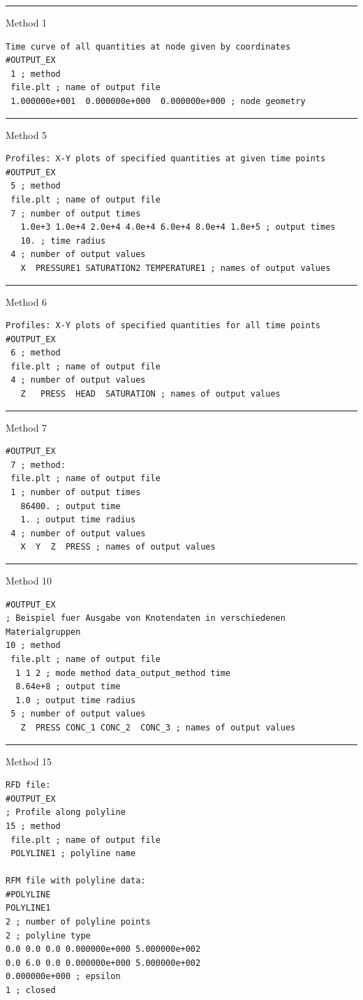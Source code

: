 \hrule
Method 1
\small
\begin{verbatim}
Time curve of all quantities at node given by coordinates
#OUTPUT_EX
 1 ; method
 file.plt ; name of output file
 1.000000e+001  0.000000e+000  0.000000e+000 ; node geometry
\end{verbatim}
\normalsize

\hrule
Method 5
\small
\begin{verbatim}
Profiles: X-Y plots of specified quantities at given time points
#OUTPUT_EX
 5 ; method
 file.plt ; name of output file
 7 ; number of output times
   1.0e+3 1.0e+4 2.0e+4 4.0e+4 6.0e+4 8.0e+4 1.0e+5 ; output times
   10. ; time radius
 4 ; number of output values
   X  PRESSURE1 SATURATION2 TEMPERATURE1 ; names of output values
\end{verbatim}
\normalsize

\hrule
Method 6
\small
\begin{verbatim}
Profiles: X-Y plots of specified quantities for all time points
#OUTPUT_EX
 6 ; method
 file.plt ; name of output file
 4 ; number of output values
   Z   PRESS  HEAD  SATURATION ; names of output values
\end{verbatim}
\normalsize

\hrule
Method 7
\small
\begin{verbatim}
#OUTPUT_EX
 7 ; method:
 file.plt ; name of output file
 1 ; number of output times
   86400. ; output time
   1. ; output time radius
 4 ; number of output values
   X  Y  Z  PRESS ; names of output values
\end{verbatim}
\normalsize

\hrule
Method 10
\small
\begin{verbatim}
#OUTPUT_EX
; Beispiel fuer Ausgabe von Knotendaten in verschiedenen Materialgruppen
10 ; method
 file.plt ; name of output file
  1 1 2 ; mode method data_output_method time
  8.64e+8 ; output time
  1.0 ; output time radius
 5 ; number of output values
   Z  PRESS CONC_1 CONC_2  CONC_3 ; names of output values
\end{verbatim}
\normalsize

\hrule
Method 15
\small
\begin{verbatim}
RFD file:
#OUTPUT_EX
; Profile along polyline
15 ; method
 file.plt ; name of output file
 POLYLINE1 ; polyline name

RFM file with polyline data:
#POLYLINE
POLYLINE1
2 ; number of polyline points
2 ; polyline type
0.0 0.0 0.0 0.000000e+000 5.000000e+002
0.0 6.0 0.0 0.000000e+000 5.000000e+002
0.000000e+000 ; epsilon
1 ; closed
\end{verbatim}
\normalsize

